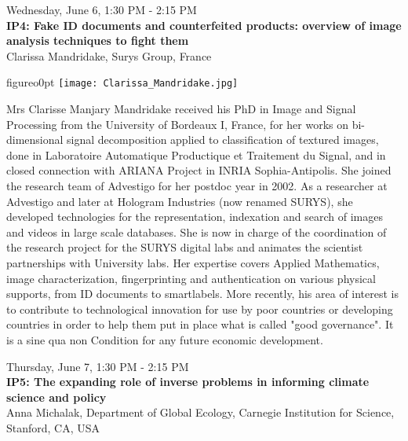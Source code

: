 \newpage\vspace{2cm}
\begin{center}{\Large{
Wednesday, June 6, 1:30 PM - 2:15 PM \\
\textbf{IP4: Fake ID documents and counterfeited products: overview of image analysis techniques to fight them}\\
Clarissa Mandridake, Surys Group, France}}
\end{center}
\vspace{1cm}

\begin{wrapfloat}{figure}{o}{0pt}
\texttt{[image: Clarissa\_Mandridake.jpg]}
\end{wrapfloat}
Mrs Clarisse Manjary Mandridake received his PhD in Image and Signal Processing from the University of Bordeaux I, France, for her works on bi-dimensional signal decomposition applied to classification of textured images, done in Laboratoire Automatique Productique et Traitement du Signal, and in closed connection with ARIANA Project in INRIA Sophia-Antipolis. She joined the research team of Advestigo for her postdoc year in 2002. As a researcher at Advestigo and later at Hologram Industries (now renamed SURYS), she developed technologies for the representation, indexation and search of images and videos in large scale databases. She is now in charge of the coordination of the research project for the SURYS digital labs and animates the scientist partnerships with University labs. Her expertise covers Applied Mathematics, image characterization, fingerprinting and authentication on various physical supports, from ID documents to smartlabels. More recently, his area of interest is to contribute to technological innovation for use by poor countries or developing countries in order to help them put in place what is called "good governance". It is a sine qua non Condition for any future economic development.


\newpage\vspace{2cm}
\begin{center}{\Large{
Thursday, June 7, 1:30 PM - 2:15 PM \\
\textbf{IP5: The expanding role of inverse problems in informing climate science and policy}\\
Anna Michalak, Department of Global Ecology, Carnegie Institution for Science, Stanford, CA, USA}}
\end{center}
\vspace{1cm}

